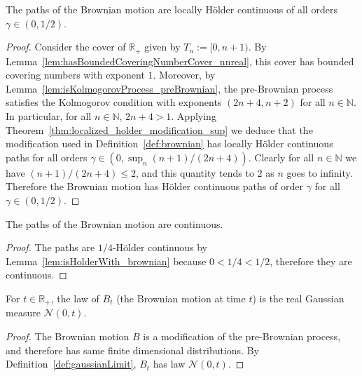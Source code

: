 \begin{lemma}\label{lem:isHolderWith_brownian}
  \leanok
The paths of the Brownian motion are locally Hölder continuous of all orders $\gamma \in (0, 1/2)$.
\end{lemma}

\begin{proof}\leanok
Consider the cover of $\mathbb{R}_+$ given by $T_n := [0, n + 1)$. By Lemma~\ref{lem:hasBoundedCoveringNumberCover_nnreal}, this cover has bounded covering numbers with exponent $1$. Moreover, by Lemma~\ref{lem:isKolmogorovProcess_preBrownian}, the pre-Brownian process satisfies the Kolmogorov condition with exponents $(2n + 4, n + 2)$ for all $n \in \mathbb{N}$.
In particular, for all $n \in \mathbb{N}$, $2n + 4 > 1$. Applying Theorem~\ref{thm:localized_holder_modification_sup} we deduce that the modification used in Definition~\ref{def:brownian} has locally Hölder continuous paths for all orders $\gamma \in (0, \sup_n (n + 1) / (2n + 4))$.
Clearly for all $n \in \mathbb{N}$ we have $(n + 1) / (2n + 4) \leqslant 2$, and this quantity tends to $2$ as $n$ goes to infinity. Therefore the Brownian motion has Hölder continuous paths of order $\gamma$ for all $\gamma \in (0, 1 / 2)$.
\end{proof}


\begin{lemma}\label{lem:continuous_brownian}
  \leanok
The paths of the Brownian motion are continuous.
\end{lemma}

\begin{proof}\leanok
The paths are $1/4$-Hölder continuous by Lemma~\ref{lem:isHolderWith_brownian} because $0 < 1/4 < 1/2$, therefore they are continuous.
\end{proof}


\begin{lemma}\label{lem:hasLaw_brownian_eval}
  \leanok
For $t \in \mathbb{R}_+$, the law of $B_t$ (the Brownian motion at time $t$) is the real Gaussian measure $\mathcal{N}(0,t)$.
\end{lemma}

\begin{proof}\leanok
The Brownian motion $B$ is a modification of the pre-Brownian process, and therefore has same finite dimensional distributions. By Definition~\ref{def:gaussianLimit}, $B_t$ has law $\mathcal{N}(0,t)$.
\end{proof}


